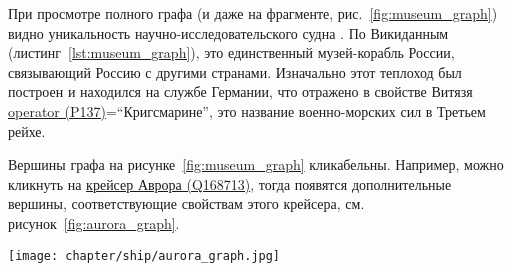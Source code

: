 При просмотре полного графа (и даже на фрагменте, рис.~\ref{fig:museum_graph}) 
видно уникальность научно-исследовательского судна . 
По Викиданным (листинг~\ref{lst:museum_graph}), 
это единственный музей-корабль России, связывающий Россию с другими странами. 
Изначально этот теплоход был построен и находился на службе Германии, 
что отражено в свойстве Витязя 
\href{https://www.wikidata.org/wiki/Property:P137}{operator (P137)}=``Кригсмарине'', 
это название военно-морских сил в Третьем рейхе.

Вершины графа на рисунке~\ref{fig:museum_graph} кликабельны. Например, можно кликнуть на \href{https://www.wikidata.org/wiki/Q168713}{крейсер Аврора (Q168713)}, тогда появятся дополнительные вершины, соответствующие свойствам этого крейсера, см. рисунок~\ref{fig:aurora_graph}.

\newpage
\begin{figure*}[h]
  \texttt{[image: chapter/ship/aurora\_graph.jpg]}
  \caption[Граф свойств Авроры, 2021 год.]{Граф свойств \href{https://www.wikidata.org/wiki/Q168713}{крейсера Аврора (Q168713)} на 2021 год.}%
  \label{fig:aurora_graph}%
\end{figure*}






